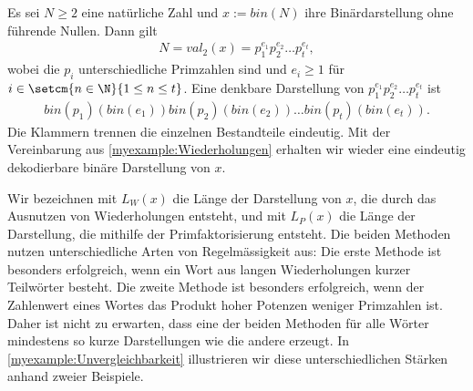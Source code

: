 \begin{myexample}\label{myexample:Primkomprimierung}
Es sei $N\geq2$ eine natürliche Zahl und $x:=bin(N)$ ihre Binärdarstellung ohne führende Nullen. Dann gilt
\begin{align*}
	N=val_2(x) = p_1^{e_1}p_2^{e_2}\ldots p_t^{e_t},
\end{align*}
wobei die $p_i$ unterschiedliche Primzahlen sind und $e_i\geq 1$ für $i\in\setcm{n\in\N}{1\leq n\leq t}$.
Eine denkbare Darstellung von $p_1^{e_1}p_2^{e_2}\ldots p_t^{e_t}$ ist
\begin{align*}
	bin(p_1)(bin(e_1))bin(p_2)(bin(e_2))\ldots bin(p_t)(bin(e_t)).
\end{align*}
Die Klammern trennen die einzelnen Bestandteile eindeutig. Mit der Vereinbarung aus \cref{myexample:Wiederholungen} erhalten wir wieder eine eindeutig dekodierbare binäre Darstellung von $x$.
\end{myexample}

Wir bezeichnen mit $L_W(x)$ die Länge der Darstellung von $x$, die durch das Ausnutzen von Wiederholungen entsteht, und mit $L_P(x)$ die Länge der Darstellung, die mithilfe der Primfaktorisierung entsteht. Die beiden Methoden nutzen unterschiedliche Arten von Regelmässigkeit aus: Die erste Methode ist besonders erfolgreich, wenn ein Wort aus langen Wiederholungen kurzer Teilwörter besteht. Die zweite Methode ist besonders erfolgreich, wenn der Zahlenwert eines Wortes das Produkt hoher Potenzen weniger Primzahlen ist. Daher ist nicht zu erwarten, dass eine der beiden Methoden für alle Wörter mindestens so kurze Darstellungen wie die andere erzeugt. In \cref{myexample:Unvergleichbarkeit} illustrieren wir diese unterschiedlichen Stärken anhand zweier Beispiele.

